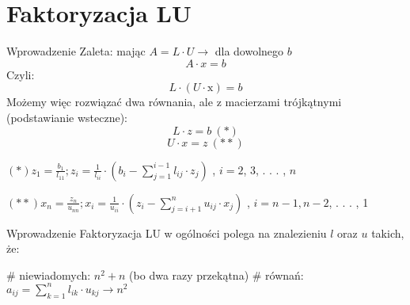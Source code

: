 
\section{Faktoryzacja LU}
\begin{frame}{Wprowadzenie}
Zaleta: mając $A=L\cdot U\rightarrow $ dla dowolnego $b$
$$
A\cdot x=b
$$
Czyli:
$$
L\cdot(U\cdot \mathrm{x})=b
$$
Możemy więc rozwiązać dwa równania, ale z macierzami trójkątnymi (podstawianie wsteczne):
$$
L\cdot z=b\ (*)
$$
$$
U\cdot x=z\ (**)
$$
\begin{center}
$(*)z_{1}=\displaystyle \frac{b_{1}}{l_{11}};z_{i}=\frac{1}{l_{ii}}\cdot(b_{i}-\sum_{j=1}^{i-1}l_{ij}\cdot z_{j})$ , $i=2$, 3, . . . , $n$
\end{center}
$(**)x_{n}=\displaystyle \frac{z_{n}}{u_{nn}};x_{i}=\frac{1}{u_{ii}}\cdot(z_{i}-\sum_{j=i+1}^{n}u_{ij}\cdot x_{j})$ , $i=n-1, n-2$, . . . , 1
\end{frame}
\begin{frame}{Wprowadzenie}
Faktoryzacja LU w ogólności polega na znalezieniu $l$ oraz $u$ takich, że:
\vspace{0.5cm}

\# niewiadomych: $n^{2}+n$ (bo dwa razy przekątna) \newline
\# r\'{o}wna\'{n}: $a_{ij}=\displaystyle \sum_{k=1}^{n}l_{ik}\cdot u_{kj}\rightarrow n^{2}$
\end{frame}
